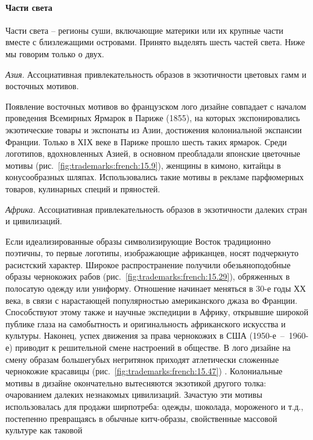 \paragraph{Части света}

 Части света -- регионы суши, включающие материки или их
  крупные части вместе с близлежащими островами. Принято выделять шесть частей
  света. Ниже мы говорим только о двух.
  
\emph{Азия}. Ассоциативная привлекательность образов в экзотичности цветовых
    гамм и восточных мотивов.

    Появление восточных мотивов во французском лого дизайне совпадает с началом
    проведения Всемирных Ярмарок в Париже (1855), на которых экспонировались
    экзотические товары и экспонаты из Азии, достижения колониальной экспансии
    Франции. Только в ХIХ веке в Париже прошло шесть таких ярмарок. Среди логотипов,
    вдохновленных Азией, в основном преобладали японские цветочные мотивы
    (рис.~\ref{fig:trademarks:french:15.9}), женщины в кимоно, китайцы в
    конусообразных шляпах.  Использовались такие мотивы в рекламе парфюмерных
    товаров, кулинарных специй и пряностей. %

\emph{Африка}. Ассоциативная привлекательность образов в экзотичности далеких
    стран и цивилизаций.

    Если идеализированные образы символизирующие Восток традиционно поэтичны, то
    первые логотипы, изображающие африканцев, носят подчеркнуто расистский
    характер. Широкое распространение получили обезьяноподобные образы чернокожих
    рабов (рис.~\ref{fig:trademarks:french:15.29}), обряженных в полосатую одежду
    или униформу.  Отношение начинает меняться в 30-е годы ХХ века, в связи с
    нарастающей популярностью американского джаза во Франции. Способствуют этому
    также и научные экспедиции в Африку, открывшие широкой публике глаза на
    самобытность и оригинальность африканского искусства и культуры.  Наконец, успех
    движения за права чернокожих в США (1950-е~--~1960-е) приводит к решительной
    смене настроений в обществе. В лого дизайне на смену образам большегубых
    негритянок приходят атлетически сложенные чернокожие красавицы
    (рис.~\ref{fig:trademarks:french:15.47}) . Колониальные мотивы в дизайне
    окончательно вытесняются экзотикой другого толка: очарованием далеких незнакомых
    цивилизаций. Зачастую эти мотивы использовалась для продажи ширпотреба: одежды,
    шоколада, мороженого и т.д., постепенно превращаясь в обычные китч-образы,
    свойственные массовой культуре как таковой %

